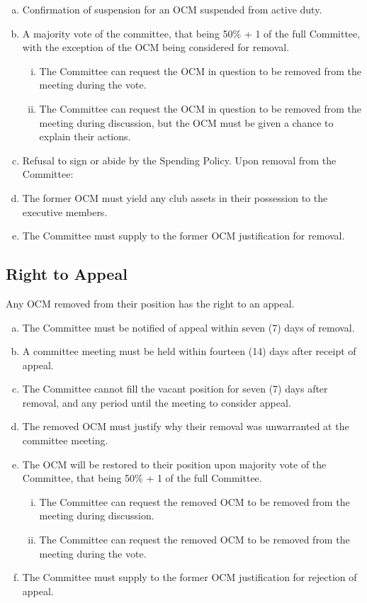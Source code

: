 \documentclass[a4paper,12pt]{article}
\begin{document}
\begin{enumerate}[a)]
	\item Confirmation of suspension for an OCM suspended from active duty.
	\item A majority vote of the committee, that being 50\% + 1 of the full Committee, with the exception of the OCM being considered for removal.
	\begin{enumerate}[i)]
		\item The Committee can request the OCM in question to be removed from the meeting during the vote.
		\item The Committee can request the OCM in question to be removed from the meeting during discussion, but the OCM must be given a chance to explain their actions.
	\end{enumerate}
	\item Refusal to sign or abide by the Spending Policy. Upon removal from the Committee:
	\item The former OCM must yield any club assets in their possession to the executive members.
	\item The Committee must supply to the former OCM justification for removal.
\end{enumerate}

\subsection{Right to Appeal}

Any OCM removed from their position has the right to an appeal.

\begin{enumerate}[a)]
	\item The Committee must be notified of appeal within seven (7) days of removal.
	\item A committee meeting must be held within fourteen (14) days after receipt of appeal.
	\item The Committee cannot fill the vacant position for seven (7) days after removal, and any period until the meeting to consider appeal.
	\item The removed OCM must justify why their removal was unwarranted at the committee meeting.
	\item The OCM will be restored to their position upon majority vote of the Committee, that being 50\% + 1 of the full Committee.
	\begin{enumerate}[i)]
		\item The Committee can request the removed OCM to be removed from the meeting during discussion.
		\item The Committee can request the removed OCM to be removed from the meeting during the vote.
	\end{enumerate}
	\item The Committee must supply to the former OCM justification for rejection of appeal.
\end{enumerate}
\end{document}
